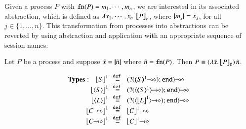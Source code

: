 Given a process $P$ with $\mathtt{fn}(P) = m_1, \cdots, m_n$, we are interested in its associated abstraction, which is defined as
$\lambda x_1, \cdots, x_n.\,\big\lfloor\!\!\big\lfloor P\big\rfloor\!\!\big\rfloor^{}_\epsilon$, where $|\!|m_j|\!| = x_j$, for all $j \in \{1, \ldots, n\}$.
This transformation from processes into abstractions can be reverted by
using abstraction and application with an appropriate sequence of session names:
%
\begin{proposition}\rm
	Let $P$ be a \HOp process and 
	suppose $\tilde{x} = |\!|\tilde{n}|\!|$ where 
$\tilde{n} = \mathtt{fn}(P)$.
	Then $P \equiv (\lambda \tilde{x}.\,\big\lfloor\!\!\big\lfloor P\big\rfloor\!\!\big\rfloor^{}_\emptyset)\, {\tilde{n}}$.
\end{proposition}

\begin{figure}[t]
\[
\begin{array}{rcll}
\noindent{\bf Types:} \quad 
\vtmap{{S}}{1}	&\!\!\defeq\!\!&	\lhot{(\btinp{\lhot{\tmap{S}{1}}} \tinact)}  \\
\vtmap{\chtype{S}}{1}&\!\!\defeq\!\!&	\lhot{(\btinp{\shot{\chtype{\tmap{S}{1}}}} \tinact)}  \\
\vtmap{\chtype{L}}{1}&\!\!\defeq\!\!&	\lhot{(\btinp{\shot{\chtype{\vtmap{L}{1}}}} \tinact)} \\
\vtmap{\lhot{C}}{1} &\!\!\defeq\!\!& \lhot{\vtmap{C}{1}}\\
\vtmap{\shot{C}}{1} &\!\!\defeq\!\!& \shot{\vtmap{C}{1}}\\


\end{array}\]
\end{figure}
